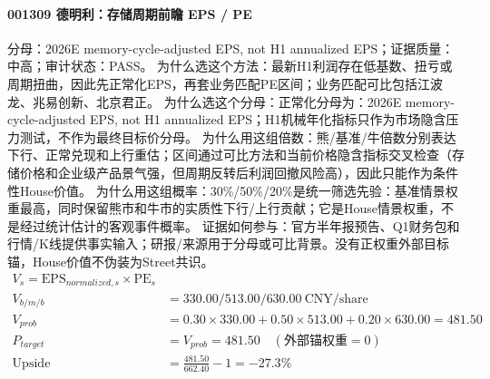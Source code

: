 \paragraph{001309 德明利：存储周期前瞻 EPS / PE}
分母：2026E memory-cycle-adjusted EPS, not H1 annualized EPS；证据质量：中高；审计状态：PASS。
为什么选这个方法：最新H1利润存在低基数、扭亏或周期扭曲，因此先正常化EPS，再套业务匹配PE区间；业务匹配可比包括江波龙、兆易创新、北京君正。
为什么选这个分母：正常化分母为：2026E memory-cycle-adjusted EPS, not H1 annualized EPS；H1机械年化指标只作为市场隐含压力测试，不作为最终目标价分母。
为什么用这组倍数：熊/基准/牛倍数分别表达下行、正常兑现和上行重估；区间通过可比方法和当前价格隐含指标交叉检查（存储价格和企业级产品景气强，但周期反转后利润回撤风险高），因此只能作为条件性House价值。
为什么用这组概率：30\%/50\%/20\%是统一筛选先验：基准情景权重最高，同时保留熊市和牛市的实质性下行/上行贡献；它是House情景权重，不是经过统计估计的客观事件概率。
证据如何参与：官方半年报预告、Q1财务包和行情/K线提供事实输入；研报/来源用于分母或可比背景。没有正权重外部目标锚，House价值不伪装为Street共识。
\begin{align*}
V_s=\mathrm{EPS}_{normalized,s}\times \mathrm{PE}_s\\
V_{b/m/b} &= 330.00/513.00/630.00\ \mathrm{CNY/share}\\
V_{prob} &= 0.30\times 330.00+0.50\times 513.00+0.20\times 630.00=481.50\\
P_{target} &= V_{prob}=481.50\quad(\text{外部锚权重}=0)\\
\mathrm{Upside} &= \frac{481.50}{662.40}-1=-27.3\%\\
\end{align*}

